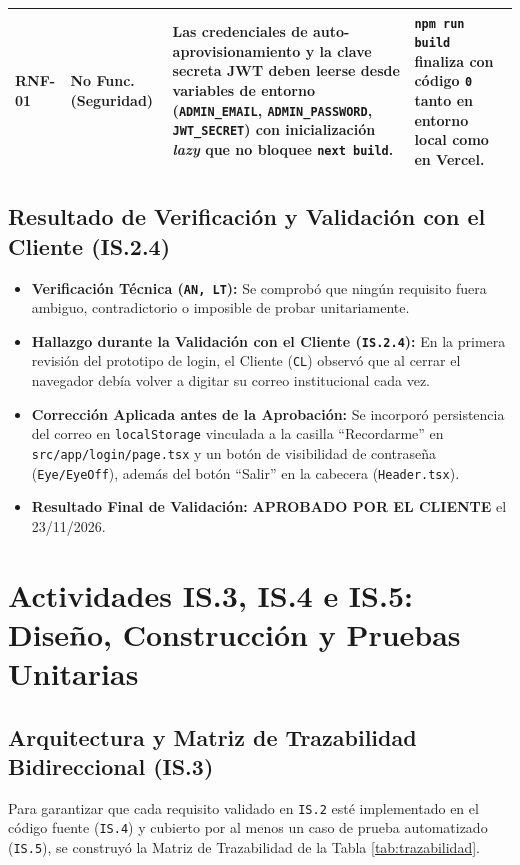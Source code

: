 \documentclass[11pt,a4paper]{article}
\begin{document}
\begin{table}[h!]
\begin{tabular}{@{}p{1.5cm}p{2.2cm}p{7.8cm}p{4.0cm}@{}}
\textbf{RNF-01} & No Func. (Seguridad) & Las credenciales de auto-aprovisionamiento y la clave secreta JWT deben leerse desde variables de entorno (\texttt{ADMIN\_EMAIL}, \texttt{ADMIN\_PASSWORD}, \texttt{JWT\_SECRET}) con inicialización \textit{lazy} que no bloquee \texttt{next build}. & \texttt{npm run build} finaliza con código \texttt{0} tanto en entorno local como en Vercel. \\
\bottomrule
\end{tabular}
\end{table}

\subsection{Resultado de Verificación y Validación con el Cliente (IS.2.4)}
\begin{itemize}[noitemsep]
  \item \textbf{Verificación Técnica (\texttt{AN, LT}):} Se comprobó que ningún requisito fuera ambiguo, contradictorio o imposible de probar unitariamente.
  \item \textbf{Hallazgo durante la Validación con el Cliente (\texttt{IS.2.4}):} En la primera revisión del prototipo de login, el Cliente (\texttt{CL}) observó que al cerrar el navegador debía volver a digitar su correo institucional cada vez.
  \item \textbf{Corrección Aplicada antes de la Aprobación:} Se incorporó persistencia del correo en \texttt{localStorage} vinculada a la casilla ``Recordarme'' en \texttt{src/app/login/page.tsx} y un botón de visibilidad de contraseña (\texttt{Eye/EyeOff}), además del botón ``Salir'' en la cabecera (\texttt{Header.tsx}).
  \item \textbf{Resultado Final de Validación:} \textcolor{okGreen}{\textbf{APROBADO POR EL CLIENTE}} el 23/11/2026.
\end{itemize}

\section{Actividades IS.3, IS.4 e IS.5: Diseño, Construcción y Pruebas Unitarias}

\subsection{Arquitectura y Matriz de Trazabilidad Bidireccional (IS.3)}
Para garantizar que cada requisito validado en \texttt{IS.2} esté implementado en el código fuente (\texttt{IS.4}) y cubierto por al menos un caso de prueba automatizado (\texttt{IS.5}), se construyó la Matriz de Trazabilidad de la Tabla \ref{tab:trazabilidad}.
\end{document}
